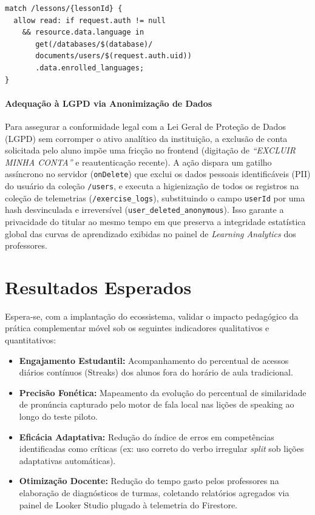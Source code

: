 \documentclass[portuguese]{sbcreviews-2025}%
\begin{document}
{\footnotesize
\begin{verbatim}
match /lessons/{lessonId} {
  allow read: if request.auth != null
    && resource.data.language in 
       get(/databases/$(database)/
       documents/users/$(request.auth.uid))
       .data.enrolled_languages;
}
\end{verbatim}
}

\paragraph{Adequação à LGPD via Anonimização de Dados} Para assegurar a conformidade legal com a Lei Geral de Proteção de Dados (LGPD) sem corromper o ativo analítico da instituição, a exclusão de conta solicitada pelo aluno impõe uma fricção no frontend (digitação de \textit{``EXCLUIR MINHA CONTA''} e reautenticação recente). A ação dispara um gatilho assíncrono no servidor (\texttt{onDelete}) que exclui os dados pessoais identificáveis (PII) do usuário da coleção \texttt{/users}, e executa a higienização de todos os registros na coleção de telemetrias (\verb|/exercise_logs|), substituindo o campo \texttt{userId} por uma hash desvinculada e irreversível (\verb|user_deleted_anonymous|). Isso garante a privacidade do titular ao mesmo tempo em que preserva a integridade estatística global das curvas de aprendizado exibidas no painel de \textit{Learning Analytics} dos professores.

\section{Resultados Esperados}
\label{sec:resultados}

Espera-se, com a implantação do ecossistema, validar o impacto pedagógico da prática complementar móvel sob os seguintes indicadores qualitativos e quantitativos:
\begin{itemize}
    \item \textbf{Engajamento Estudantil:} Acompanhamento do percentual de acessos diários contínuos (Streaks) dos alunos fora do horário de aula tradicional.
    \item \textbf{Precisão Fonética:} Mapeamento da evolução do percentual de similaridade de pronúncia capturado pelo motor de fala local nas lições de speaking ao longo do teste piloto.
    \item \textbf{Eficácia Adaptativa:} Redução do índice de erros em competências identificadas como críticas (ex: uso correto do verbo irregular \textit{split} sob lições adaptativas automáticas).
    \item \textbf{Otimização Docente:} Redução do tempo gasto pelos professores na elaboração de diagnósticos de turmas, coletando relatórios agregados via painel de Looker Studio plugado à telemetria do Firestore.
\end{itemize}
\end{document}
